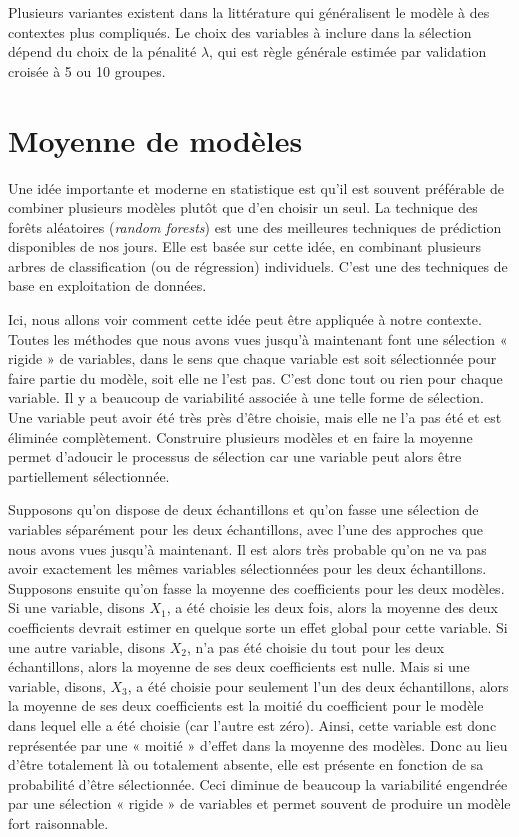 \documentclass[
  11pt,
  letterpaper,
]{book}
\theoremstyle{definition}
\theoremstyle{definition}
\theoremstyle{definition}
\theoremstyle{definition}
\theoremstyle{remark}
\begin{document}
Plusieurs variantes existent dans la littérature qui généralisent le modèle à des contextes plus compliqués. Le choix des variables à inclure dans la sélection dépend du choix de la pénalité \(\lambda\), qui est règle générale estimée par validation croisée à 5 ou 10 groupes.

\hypertarget{moyenne-de-moduxe8les}{%
\section{Moyenne de modèles}\label{moyenne-de-moduxe8les}}

Une idée importante et moderne en statistique est qu'il est souvent préférable de combiner plusieurs modèles plutôt que d'en choisir un seul. La technique des forêts aléatoires (\emph{random forests}) est une des meilleures techniques de prédiction disponibles de nos jours. Elle est basée sur cette idée, en combinant plusieurs arbres de classification (ou de régression) individuels. C'est une des techniques de base en exploitation de données.

Ici, nous allons voir comment cette idée peut être appliquée à notre contexte. Toutes les méthodes que nous avons vues jusqu'à maintenant font une sélection « rigide » de variables, dans le sens que chaque variable est soit sélectionnée pour faire partie du modèle, soit elle ne l'est pas. C'est donc tout ou rien pour chaque variable. Il y a beaucoup de variabilité associée à une telle forme de sélection. Une variable peut avoir été très près d'être choisie, mais elle ne l'a pas été et est éliminée complètement. Construire plusieurs modèles et en faire la moyenne permet d'adoucir le processus de sélection car une variable peut alors être partiellement sélectionnée.

Supposons qu'on dispose de deux échantillons et qu'on fasse une sélection de variables séparément pour les deux échantillons, avec l'une des approches que nous avons vues jusqu'à maintenant. Il est alors très probable qu'on ne va pas avoir exactement les mêmes variables sélectionnées pour les deux échantillons. Supposons ensuite qu'on fasse la moyenne des coefficients pour les deux modèles. Si une variable, disons \(X_1\), a été choisie les deux fois, alors la moyenne des deux coefficients devrait estimer en quelque sorte un effet global pour cette variable. Si une autre variable, disons \(X_2\), n'a pas été choisie du tout pour les deux échantillons, alors la moyenne de ses deux coefficients est nulle. Mais si une variable, disons, \(X_3\), a été choisie pour seulement l'un des deux échantillons, alors la moyenne de ses deux coefficients est la moitié du coefficient pour le modèle dans lequel elle a été choisie (car l'autre est zéro). Ainsi, cette variable est donc représentée par une « moitié » d'effet dans la moyenne des modèles. Donc au lieu d'être totalement là ou totalement absente, elle est présente en fonction de sa probabilité d'être sélectionnée. Ceci diminue de beaucoup la variabilité engendrée par une sélection « rigide » de variables et permet souvent de produire un modèle fort raisonnable.
\end{document}
